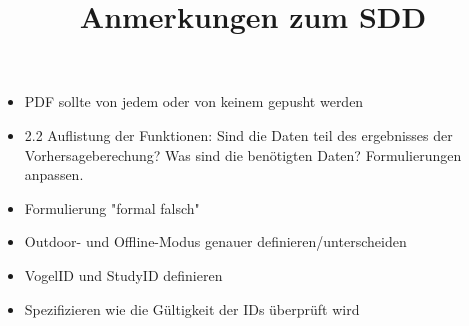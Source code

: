\documentclass[a4paper]{article}
\title{Anmerkungen zum SDD}
\begin{document}
	
	\maketitle
	
	\begin{itemize}
		\item PDF sollte von jedem oder von keinem gepusht werden
		\item 2.2 Auflistung der Funktionen: Sind die Daten teil des ergebnisses der Vorhersageberechung? Was sind die benötigten Daten? Formulierungen anpassen.
		\item Formulierung "formal falsch"
		\item Outdoor- und Offline-Modus genauer definieren/unterscheiden
		\item VogelID und StudyID definieren
		\item Spezifizieren wie die Gültigkeit der IDs überprüft wird
	\end{itemize}
	
\end{document}
